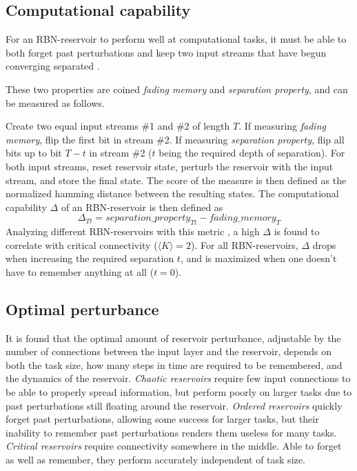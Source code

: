 \subsection{Computational capability}
\label{section:computational-capability}
For an RBN-reservoir to perform well at computational tasks,
it must be able to both forget past perturbations and keep two input streams that have begun converging separated \cite{bertschinger2004real}.

These two properties are coined \textit{fading memory} and \textit{separation property},
and can be measured \cite{rbn-reservoir} as follows.

Create two equal input streams \#1 and \#2 of length $T$.
If measuring \textit{fading memory}, flip the first bit in stream \#2.
If measuring \textit{separation property}, flip all bits up to bit $T-t$ in stream \#2
($t$ being the required depth of separation).
For both input streams, reset reservoir state, perturb the reservoir with the input stream,
and store the final state.
The score of the measure is then defined as the normalized hamming distance between the resulting states.
The computational capability $\Delta$ of an RBN-reservoir is then defined as
\begin{equation}
  \Delta_{Tt} = separation\_property_{Tt} - fading\_memory_{T}
\label{formula:accuracy}
\end{equation}
Analyzing different RBN-reservoirs with this metric \cite{rbn-reservoir},
a high $\Delta$ is found to correlate with critical connectivity ($\langle K \rangle = 2$).
For all RBN-reservoirs, $\Delta$ drops when increasing the required separation $t$,
and is maximized when one doesn't have to remember anything at all ($t=0$).

\subsection{Optimal perturbance}
\label{section:optimal-perturbance}
It is found that the optimal amount of reservoir perturbance,
adjustable by the number of connections between the input layer and the reservoir,
depends on both the task size, how many steps in time are required to be remembered,
and the dynamics of the reservoir.
\textit{Chaotic reservoirs} require few input connections to be able to properly spread information,
but perform poorly on larger tasks due to past perturbations still floating around the reservoir.
\textit{Ordered reservoirs} quickly forget past perturbations, allowing some success for larger tasks,
but their inability to remember past perturbations renders them useless for many tasks.
\textit{Critical reservoirs} require connectivity somewhere in the middle.
Able to forget as well as remember, they perform accurately independent of task size.


